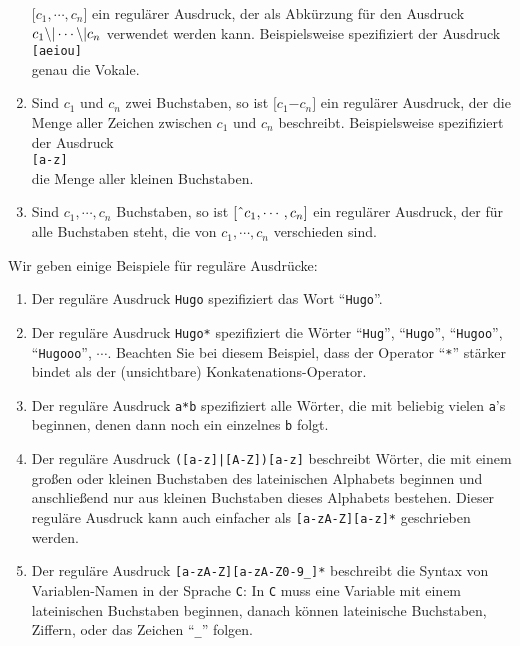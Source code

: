 \begin{enumerate}
      $\mathtt{[}c_1,\cdots, c_n\mathtt{]}$ ein regul\"arer Ausdruck, der als Abk\"urzung
      f\"ur den Ausdruck $c_1 \mathtt{\symbol{92}|} \cdots \mathtt{\symbol{92}|} c_n$
      verwendet werden kann.  Beispielsweise spezifiziert der Ausdruck
      \\[0.2cm]
      \hspace*{1.3cm}
      \texttt{[aeiou]}
      \\[0.2cm]
      genau die Vokale.
\item Sind $c_1$ und $c_n$ zwei Buchstaben, so ist
      $\mathtt{[}c_1\mathtt{-}c_n\mathtt{]}$ ein regul\"arer Ausdruck, der 
      die Menge aller Zeichen zwischen $c_1$ und $c_n$ beschreibt.  Beispielsweise
      spezifiziert der Ausdruck 
      \\[0.2cm]
      \hspace*{1.3cm}
      \texttt{[a-z]}
      \\[0.2cm]
      die Menge aller kleinen Buchstaben.
\item Sind $c_1, \cdots, c_n$ Buchstaben, so ist
      $\mathtt{[\symbol{94}}c_1,\cdots, c_n\mathtt{]}$ ein regul\"arer Ausdruck, 
      der f\"ur alle Buchstaben steht, die von $c_1, \cdots, c_n$ verschieden sind.
\end{enumerate}
Wir geben einige Beispiele f\"ur regul\"are Ausdr\"ucke:
\begin{enumerate}
\item Der regul\"are Ausdruck \texttt{Hugo} spezifiziert das Wort ``\texttt{Hugo}''.
\item Der regul\"are Ausdruck \texttt{Hugo*} spezifiziert die W\"orter 
      ``\texttt{Hug}'',
      ``\texttt{Hugo}'',
      ``\texttt{Hugoo}'',
      ``\texttt{Hugooo}'', $\cdots$.
      Beachten Sie bei diesem Beispiel, dass der Operator ``\texttt{*}'' st\"arker bindet
      als der (unsichtbare) Konkatenations-Operator.
\item Der regul\"are Ausdruck \texttt{a*b} spezifiziert alle W\"orter,
      die mit beliebig vielen \texttt{a}'s beginnen, denen dann noch ein einzelnes
      \texttt{b} folgt.
\item Der regul\"are Ausdruck 
      \texttt{([a-z]|[A-Z])[a-z]} beschreibt W\"orter,
      die mit einem gro{\ss}en oder kleinen Buchstaben des lateinischen Alphabets beginnen
      und anschlie{\ss}end nur aus kleinen Buchstaben dieses Alphabets bestehen.  Dieser
      regul\"are Ausdruck kann auch einfacher als \texttt{[a-zA-Z][a-z]*} geschrieben werden.
\item Der regul\"are Ausdruck \texttt{[a-zA-Z][a-zA-Z0-9\_]*} beschreibt die Syntax von
      Variablen-Namen in der Sprache \texttt{C}:  In \texttt{C} muss eine Variable
      mit einem lateinischen Buchstaben beginnen, danach k\"onnen lateinische Buchstaben,
      Ziffern, oder das Zeichen ``\texttt{\_}'' folgen.
\end{enumerate}

